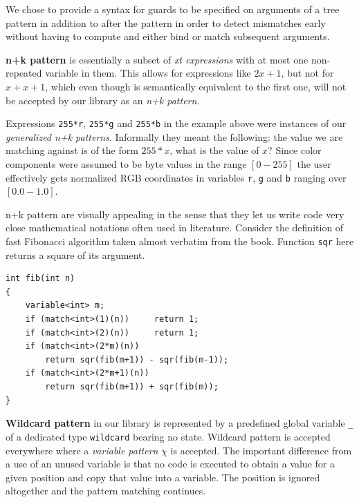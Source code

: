 \documentclass[preprint]{sigplanconf}
\makeatletter
\DeclareRobustCommand{\code}[1]{{\lstinline[breaklines=false,escapechar=@]{#1}}}
\makeatother
\begin{document}
We chose to provide a syntax for guards to be specified on arguments of a tree 
pattern in addition to after the pattern in order to detect mismatches early 
without having to compute and either bind or match subsequent arguments.

{\bf n+k pattern} is essentially a subset of \emph{xt expressions} with at most 
one non-repeated variable in them. This allows for expressions like $2x+1$, but 
not for $x+x+1$, which even though is semantically equivalent to the first one, 
will not be accepted by our library as an \emph{n+k pattern}.

Expressions \code{255*r}, \code{255*g} and \code{255*b} in the example above 
were instances of our \emph{generalized n+k patterns}. Informally they meant the 
following: the value we are matching against is of the form $255*x$, what is the 
value of $x$? Since color components were assumed to be byte values in the range 
$\left[0-255\right]$ the user effectively gets normalized RGB coordinates in 
variables \code{r}, \code{g} and \code{b} ranging over $\left[0.0-1.0\right]$.

n+k pattern are visually appealing in the sense that they let us write code very 
close mathematical notations often used in literature. Consider the definition 
of fast Fibonacci algorithm taken almost verbatim from the book. Function 
\code{sqr} here returns a square of its argument.

\begin{lstlisting}
int fib(int n)
{
    variable<int> m;
    if (match<int>(1)(n))     return 1;
    if (match<int>(2)(n))     return 1;
    if (match<int>(2*m)(n))
        return sqr(fib(m+1)) - sqr(fib(m-1));
    if (match<int>(2*m+1)(n))
        return sqr(fib(m+1)) + sqr(fib(m));
}
\end{lstlisting}

{\bf Wildcard pattern} in our library is represented by a predefined global 
variable \code{_} of a dedicated type \code{wildcard} bearing no state. 
Wildcard pattern is accepted everywhere where a \emph{variable pattern} $\chi$ 
is accepted. The important difference from a use of an unused variable is that 
no code is executed to obtain a value for a given position and copy that value 
into a variable. The position is ignored altogether and the pattern matching 
continues.
\end{document}
